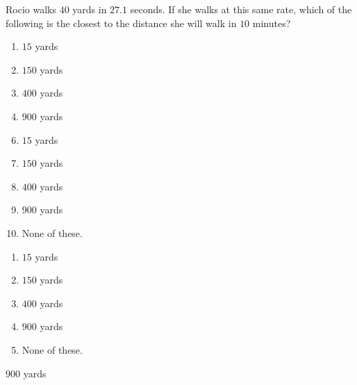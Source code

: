  
Rocio walks $40$ yards in $27.1$ seconds.  If she walks at this same rate, which of the following is the closest to the distance she will walk in $10$ minutes?


\ifsat
	\begin{enumerate}[label=\Alph*)]
		\item $15 $ yards
		\item $150 $ yards
		\item $400 $ yards
		\item $900 $ yards %
	\end{enumerate}
\else
\fi

\ifacteven
	\begin{enumerate}[label=\textbf{\Alph*.},itemsep=\fill,align=left]
		\setcounter{enumii}{5}
		\item $15 $ yards
		\item $150 $ yards
		\item $400 $ yards
		\addtocounter{enumii}{1}
		\item $900 $ yards %
		\item None of these. 
	\end{enumerate}
\else
\fi

\ifactodd
	\begin{enumerate}[label=\textbf{\Alph*.},itemsep=\fill,align=left]
		\item $15 $ yards
		\item $150 $ yards
		\item $400 $ yards
		\item $900 $ yards %
		\item None of these. 
	\end{enumerate}
\else
\fi

\ifgridin
 $900 $ yards %

\else
\fi

